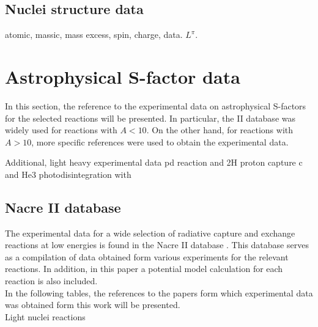 \documentclass[openany]{book}
\begin{document}
\subsection{Nuclei structure data} \label{sub:nucleiStructureData}

atomic, massic, mass excess, spin, charge, data. $L^{\pi}$.

\section{Astrophysical S-factor data} \label{sec:sfactorData}

In this section, the reference to the experimental data on astrophysical S-factors for the selected reactions will be presented. In particular, the  II database was widely used for reactions with $A < 10$. On the other hand, for reactions with $A > 10$, more specific references were used to obtain the experimental data.

Additional, light heavy experimental data pd reaction \cite{bystritsky_gerasimov_krylov_parzhitskii_dudkin_kaminskii_nechaev_padalko_petrov_mesyats_et_2008} and 2H proton capture c\cite{schmid_chasteler_laymon_weller_prior_tilley_1995} and He3 photodisintegration \cite{berman_koester_smith_1964} with \cite{warren_erdman_robertson_axen_macdonald_1963}

\subsection{Nacre II database} \label{sub:nacreII}

The experimental data for a wide selection of radiative capture and exchange reactions at low energies is found in the Nacre II database \cite{xu_takahashi_goriely_arnould_ohta_utsunomiya_2013}. This database serves as a compilation of data obtained form various experiments for the relevant reactions. In addition, in this paper a potential model calculation for each reaction is also included.\\

In the following tables, the references to the papers form which experimental data was obtained form this work will be presented. \\

Light nuclei reactions
\end{document}
